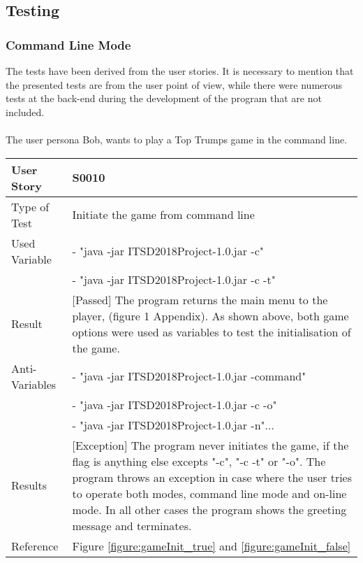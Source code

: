 \newpage
\subsection{Testing}
\label{section:testing}
\subsubsection{Command Line Mode}
The tests have been derived from the user stories. It is necessary to mention that the presented tests are from the user point of view, while there were numerous tests at the back-end during the development of the program that are not included. \\
\vspace{0.1cm}\\
The user persona Bob, wants to play a Top Trumps game in the command line.    
\vspace{0.2cm}\\
\begin{tabular}{l | p{12cm}}
User Story & \textbf{S0010} \\
\hline
Type of Test & Initiate the game from command line\\
\hline
Used Variable & 
 - "java -jar ITSD2018Project-1.0.jar -c" \\
 & 
 - "java -jar ITSD2018Project-1.0.jar -c -t"
\\
\hline
Result & [Passed] The program returns the main menu to the player, (figure 1 Appendix). As shown above, both game options were used as variables to test the initialisation of the game.\\ 
\hline
Anti-Variables & - "java -jar ITSD2018Project-1.0.jar -command"\\
& - "java -jar ITSD2018Project-1.0.jar -c -o"\\
& - "java -jar ITSD2018Project-1.0.jar -n"...\\
\hline
Results & [Exception] The program never initiates the game, if the flag is anything else excepts "-c", "-c -t" or "-o". The program throws an exception in case where the user tries to operate both modes, command line mode and on-line mode. In all other cases the program shows the greeting message and terminates.\\
\hline
Reference & Figure \ref{figure:gameInit_true} and \ref{figure:gameInit_false}\\ \hline 
\end{tabular}\\
\vspace{0.2cm}\\ 
